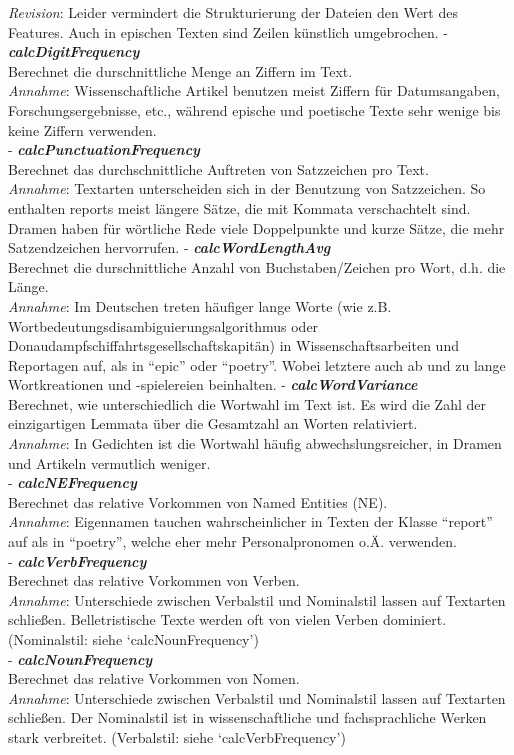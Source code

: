 \documentclass[]{article}
\begin{document}
\emph{Revision}: Leider vermindert die Strukturierung der Dateien den
Wert des Features. Auch in epischen Texten sind Zeilen künstlich
umgebrochen. - \textbf{\emph{calcDigitFrequency}}\\
Berechnet die durschnittliche Menge an Ziffern im Text.\\
\emph{Annahme}: Wissenschaftliche Artikel benutzen meist Ziffern für
Datumsangaben, Forschungsergebnisse, etc., während epische und poetische
Texte sehr wenige bis keine Ziffern verwenden.\\
- \textbf{\emph{calcPunctuationFrequency}}\\
Berechnet das durchschnittliche Auftreten von Satzzeichen pro Text.\\
\emph{Annahme}: Textarten unterscheiden sich in der Benutzung von
Satzzeichen. So enthalten reports meist längere Sätze, die mit Kommata
verschachtelt sind. Dramen haben für wörtliche Rede viele Doppelpunkte
und kurze Sätze, die mehr Satzendzeichen hervorrufen. -
\textbf{\emph{calcWordLengthAvg}}\\
Berechnet die durschnittliche Anzahl von Buchstaben/Zeichen pro Wort,
d.h. die Länge.\\
\emph{Annahme}: Im Deutschen treten häufiger lange Worte (wie z.B.
Wortbedeutungsdisambiguierungsalgorithmus oder
Donaudampfschiffahrtsgesellschaftskapitän) in Wissenschaftsarbeiten und
Reportagen auf, als in ``epic'' oder ``poetry''. Wobei letztere auch ab
und zu lange Wortkreationen und -spielereien beinhalten. -
\textbf{\emph{calcWordVariance}}\\
Berechnet, wie unterschiedlich die Wortwahl im Text ist. Es wird die
Zahl der einzigartigen Lemmata über die Gesamtzahl an Worten
relativiert.\\
\emph{Annahme}: In Gedichten ist die Wortwahl häufig
abwechslungsreicher, in Dramen und Artikeln vermutlich weniger.\\
- \textbf{\emph{calcNEFrequency}}\\
Berechnet das relative Vorkommen von Named Entities (NE).\\
\emph{Annahme}: Eigennamen tauchen wahrscheinlicher in Texten der Klasse
``report'' auf als in ``poetry'', welche eher mehr Personalpronomen o.Ä.
verwenden.\\
- \textbf{\emph{calcVerbFrequency}}\\
Berechnet das relative Vorkommen von Verben.\\
\emph{Annahme}: Unterschiede zwischen Verbalstil und Nominalstil lassen
auf Textarten schließen. Belletristische Texte werden oft von vielen
Verben dominiert. (Nominalstil: siehe `calcNounFrequency')\\
- \textbf{\emph{calcNounFrequency}}\\
Berechnet das relative Vorkommen von Nomen.\\
\emph{Annahme}: Unterschiede zwischen Verbalstil und Nominalstil lassen
auf Textarten schließen. Der Nominalstil ist in wissenschaftliche und
fachsprachliche Werken stark verbreitet. (Verbalstil: siehe
`calcVerbFrequency')
\end{document}
